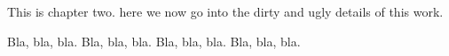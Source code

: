 
This is chapter two. here we now go into the dirty and ugly details
of this work.


Bla, bla, bla. Bla, bla, bla. Bla, bla, bla. Bla, bla, bla.
